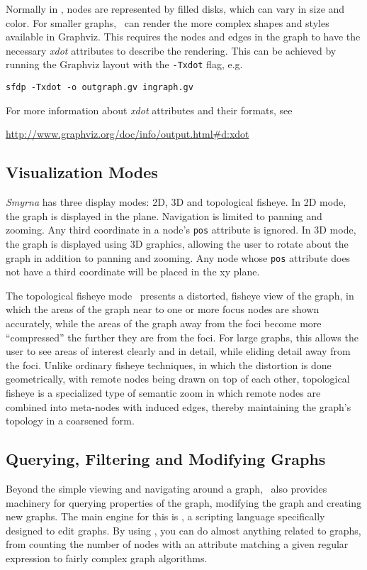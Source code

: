 Normally in \smyrna, nodes are represented by filled disks, which
can vary in size and color. For smaller graphs, \smyrna\ 
can render the more complex shapes and styles available in Graphviz.
This requires the nodes and edges in the graph to have the necessary
{\it xdot} attributes to describe the rendering. This can be achieved
by running the Graphviz layout with the {\tt -Txdot} flag, e.g.
\begin{center}
{\tt sfdp -Txdot -o outgraph.gv ingraph.gv}
\end{center}
For more information about {\it xdot} attributes and their formats,
see
\begin{center}
\url{http://www.graphviz.org/doc/info/output.html#d:xdot }
\end{center}

\subsection{Visualization Modes} 
\label{sec:vizmodes}
{\it Smyrna} has three display modes:
2D, 3D and topological fisheye. 
In 2D mode, the graph is displayed in the plane. Navigation is
limited to panning and zooming. Any third coordinate in a
node's {\tt pos} attribute is ignored.
In 3D mode, the graph is displayed using 3D graphics, allowing the
user to rotate about the graph in addition to panning and zooming.
Any node whose {\tt pos} attribute does not have a third coordinate
will be placed in the xy plane.

The topological fisheye mode~\cite{topfish} presents a 
distorted, fisheye view of the
graph, in which the areas of the graph near to one or more focus nodes
are shown accurately, while the areas of the graph away from the foci
become more ``compressed'' the further they are from the foci.
For large graphs, this allows the user to see areas of interest clearly
and in detail, while eliding detail away from the foci.
Unlike ordinary fisheye techniques, in which
the distortion is done geometrically, with remote nodes being
drawn on top of each other, 
topological fisheye is a specialized type of semantic zoom in which
remote nodes are combined into meta-nodes with induced edges, thereby
maintaining the graph's topology in a coarsened form.

\subsection{Querying, Filtering and Modifying Graphs}   
Beyond the simple viewing and navigating around a graph, \smyrna\
also provides machinery for querying properties of the graph, modifying
the graph and creating new graphs. The main engine for this is \gvpr,
a scripting language specifically designed to edit graphs. By using 
\gvpr, you can do almost anything related to graphs, from counting 
the number of nodes with an attribute matching a given regular expression to
fairly complex graph algorithms.

